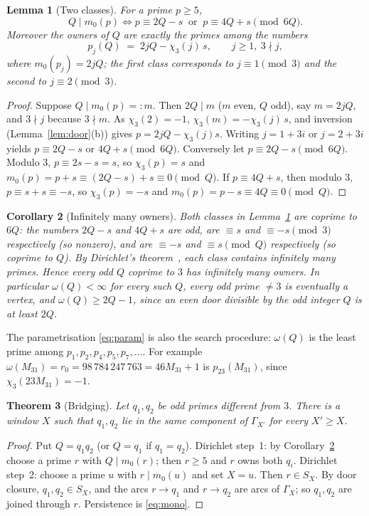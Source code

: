 \documentclass[11pt,a4paper]{article}
\newtheorem{theorem}{Theorem}[section]
\newtheorem{lemma}[theorem]{Lemma}
\newtheorem{corollary}[theorem]{Corollary}
\theoremstyle{remark}
\newcommand{\chit}{\chi_3}
\begin{document}
\begin{lemma}[Two classes]\label{lem:twoclass}
For a prime \(p\ge 5\),
\[
Q\mid m_0(p)\iff p\equiv 2Q-s\ \text{ or }\ p\equiv 4Q+s\pmod{6Q}.
\]
Moreover the owners of \(Q\) are exactly the primes among the numbers
\begin{equation}\label{eq:param}
p_j(Q)\;=\;2jQ-\chit(j)\,s,\qquad j\ge 1,\ 3\nmid j,
\end{equation}
where \(m_0(p_j)=2jQ\); the first class corresponds to \(j\equiv1\pmod 3\) and the second to \(j\equiv 2\pmod 3\).
\end{lemma}
\begin{proof}
Suppose \(Q\mid m_0(p)=:m\).
Then \(2Q\mid m\) (\(m\) even, \(Q\) odd), say \(m=2jQ\), and \(3\nmid j\) because \(3\nmid m\).
As \(\chit(2)=-1\), \(\chit(m)=-\chit(j)\,s\), and inversion (Lemma~\ref{lem:door}(b)) gives \(p=2jQ-\chit(j)s\).
Writing \(j=1+3i\) or \(j=2+3i\) yields \(p\equiv 2Q-s\) or \(4Q+s\pmod{6Q}\).
Conversely let \(p\equiv 2Q-s\pmod{6Q}\).
Modulo \(3\), \(p\equiv 2s-s=s\), so \(\chit(p)=s\) and \(m_0(p)=p+s\equiv (2Q-s)+s\equiv 0\pmod Q\).
If \(p\equiv4Q+s\), then modulo \(3\), \(p\equiv s+s\equiv -s\), so \(\chit(p)=-s\) and \(m_0(p)=p-s\equiv 4Q\equiv 0\pmod Q\).
\end{proof}

\begin{corollary}[Infinitely many owners]\label{cor:owners}
Both classes in Lemma~\ref{lem:twoclass} are coprime to \(6Q\): the numbers \(2Q-s\) and \(4Q+s\) are odd, are \(\equiv s\) and \(\equiv -s\pmod 3\) respectively (so nonzero), and are \(\equiv -s\) and \(\equiv s\pmod Q\) respectively (so coprime to \(Q\)).
By Dirichlet's theorem~\cite{Dirichlet}, each class contains infinitely many primes.
Hence every odd \(Q\) coprime to \(3\) has infinitely many owners.
In particular \(\omega(Q)<\infty\) for every such \(Q\), every odd prime \(\ne3\) is eventually a vertex, and \(\omega(Q)\ge 2Q-1\), since an even door divisible by the odd integer \(Q\) is at least \(2Q\).
\end{corollary}

The parametrisation \eqref{eq:param} is also the search procedure: \(\omega(Q)\) is the least prime among \(p_1,p_2,p_4,p_5,p_7,\dots\).
For example \(\omega(M_{31})=r_0=98\,784\,247\,763=46M_{31}+1\) is \(p_{23}(M_{31})\), since \(\chit(23M_{31})=-1\).

\begin{theorem}[Bridging]\label{thm:bridge}
Let \(q_1,q_2\) be odd primes different from \(3\).
There is a window \(X\) such that \(q_1,q_2\) lie in the same component of \(\Gamma_{X'}\) for every \(X'\ge X\).
\end{theorem}
\begin{proof}
Put \(Q=q_1q_2\) (or \(Q=q_1\) if \(q_1=q_2\)).
Dirichlet step~1: by Corollary~\ref{cor:owners} choose a prime \(r\) with \(Q\mid m_0(r)\); then \(r\ge 5\) and \(r\) owns both \(q_i\).
Dirichlet step~2: choose a prime \(u\) with \(r\mid m_0(u)\) and set \(X=u\).
Then \(r\in S_X\).
By door closure, \(q_1,q_2\in S_X\), and the arcs \(r\to q_1\) and \(r\to q_2\) are arcs of \(\Gamma_X\); so \(q_1,q_2\) are joined through \(r\).
Persistence is \eqref{eq:mono}.
\end{proof}
\end{document}
